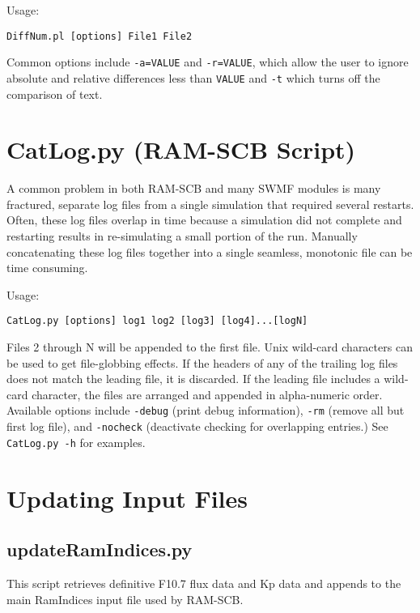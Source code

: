 Usage:
\begin{verbatim}
DiffNum.pl [options] File1 File2
\end{verbatim}

Common options include {\tt -a=VALUE} and {\tt -r=VALUE}, which allow the user to ignore absolute and relative differences less than {\tt VALUE} and {\tt -t} which turns off the comparison of text.



\section{CatLog.py (RAM-SCB Script)}
A common problem in both RAM-SCB and many SWMF modules is many fractured, separate log files from a single simulation that required several restarts. Often, these log files overlap in time because a simulation did not complete and restarting results in re-simulating a small portion of the run. Manually concatenating these log files together into a single seamless, monotonic file can be time consuming.

Usage:
\begin{verbatim}
CatLog.py [options] log1 log2 [log3] [log4]...[logN]
\end{verbatim}

Files 2 through N will be appended to the first file. Unix wild-card characters can be used to get file-globbing effects.  If the headers of any of the trailing log files does not match the leading file, it is discarded. If the leading file includes a wild-card character, the files are arranged and appended in alpha-numeric order. Available options include {\tt -debug} (print debug information), {\tt -rm} (remove all but first log file), and {\tt -nocheck} (deactivate checking for overlapping entries.) See {\tt CatLog.py -h} for examples.

\section{Updating Input Files}
\subsection{updateRamIndices.py}
This script retrieves definitive F10.7 flux data and Kp data and appends to the main RamIndices input file used by RAM-SCB.

